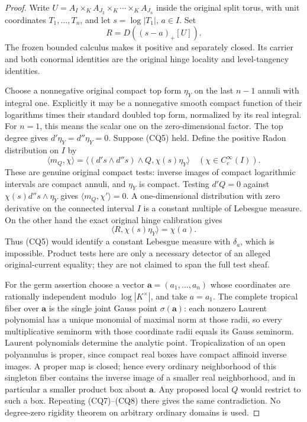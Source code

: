 \documentclass[11pt,a4paper]{article}
\numberwithin{equation}{section}
\theoremstyle{definition}
\theoremstyle{remark}
\begin{document}
\begin{proof}
Write \(U=A_I\times_K A_{J_2}\times_K\cdots\times_K A_{J_n}\)
inside the original split torus, with unit coordinates
\(T_1,\ldots,T_n\), and let \(s=\log|T_1|\), \(a\in I\).
Set
\[
                             R=D((s-a)_+[U]).
 \tag{CQ6}
\]
The frozen bounded calculus makes it positive and separately closed.
Its carrier and both conormal identities are the original hinge
locality and level-tangency identities.

Choose a nonnegative original compact top form \(\eta_Y\) on the
last \(n-1\) annuli with integral one. Explicitly it may be a
nonnegative smooth compact function of their logarithms times
their standard doubled top form, normalized by its real integral.
For \(n=1\), this means the scalar one on the zero-dimensional factor.
The top degree gives \(d'\eta_Y=d''\eta_Y=0\).
Suppose (CQ5) held. Define the positive Radon distribution on \(I\)
by
\[
 \langle m_Q,\chi\rangle
   =\langle(d's\wedge d''s)\wedge Q,\chi(s)\eta_Y\rangle
                      \quad(\chi\in C_c^\infty(I)).
 \tag{CQ7}
\]
These are genuine original compact tests: inverse images of compact
logarithmic intervals are compact annuli, and \(\eta_Y\) is compact.
Testing \(d'Q=0\) against
\(\chi(s)d''s\wedge\eta_Y\) gives
\(\langle m_Q,\chi'\rangle=0\). A one-dimensional distribution with
zero derivative on the connected interval \(I\) is a constant
multiple of Lebesgue measure. On the other hand the exact original
hinge calibration gives
\[
           \langle R,\chi(s)\eta_Y\rangle=\chi(a).
 \tag{CQ8}
\]
Thus (CQ5) would identify a constant Lebesgue measure with
\(\delta_a\), which is impossible. Product tests here are only a
necessary detector of an alleged original-current equality; they
are not claimed to span the full test sheaf.

For the germ assertion choose a vector
\(\mathbf a=(a_1,\ldots,a_n)\) whose coordinates are rationally
independent modulo \(\log|K^\times|\), and take \(a=a_1\).
The complete tropical fiber over \(\mathbf a\) is the single joint
Gauss point \(\sigma(\mathbf a)\): each nonzero Laurent polynomial
has a unique monomial of maximal norm at those radii, so every
multiplicative seminorm with those coordinate radii equals its
Gauss seminorm. Laurent polynomials determine the analytic point.
Tropicalization of an open polyannulus is proper, since compact
real boxes have compact affinoid inverse images. A proper map is
closed; hence every ordinary neighborhood of this singleton fiber
contains the inverse image of a smaller real neighborhood, and
in particular a smaller product box about \(\mathbf a\).
Any proposed local \(Q\) would restrict to such a box. Repeating
(CQ7)--(CQ8) there gives the same contradiction. No degree-zero
rigidity theorem on arbitrary ordinary domains is used.
\end{proof}
\end{document}
